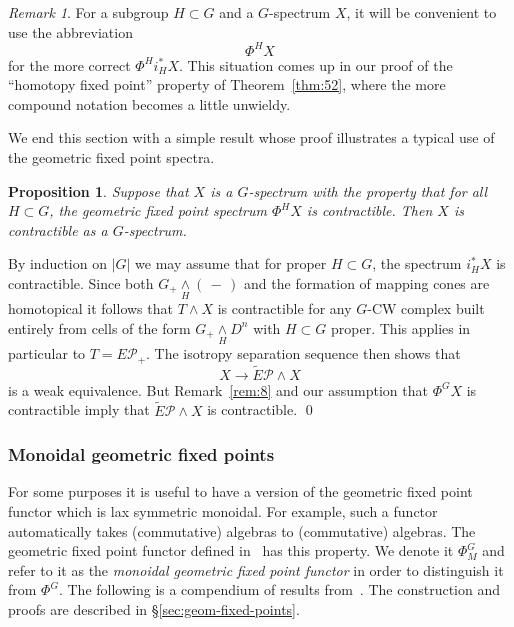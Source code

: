 \documentclass{amsart}
\newtheorem{prop}[equation]{Proposition}
\newtheorem{rem}[equation]{Remark}
\theoremstyle{definition}
\theoremstyle{remark}
\newtheorem{rem}[equation]{Remark}
\newenvironment{pf}{\bigskip{\em Proof:\/}}{\qed\medskip}
\newcommand{\slot}{\,-\,}
\newcommand{\smashove}[1]{\underset{#1}{\wedge}}
\newcommand{\gfp}[1]{\Phi^{#1}}
\newcommand{\gfpm}[1]{\Phi_{M}^{#1}}
\newcommand{\phig}{\gfp{G}}
\newcommand{\phigm}{\gfpm{G}}
\newcommand{\phih}{\gfp{H}}
\newcommand{\epfam}{E\pfamily_{+}}
\newcommand{\tepfam}{\tilde E\pfamily}
\newcommand{\pfamily}{\mathcal P}
\begin{document}
\begin{rem}
\label{rem:6} 
For a subgroup $H\subset G$ and a $G$-spectrum $X$, it
will be convenient to use the abbreviation
\[
\Phi^{H}X
\]
for the more correct $\Phi^{H}i_{H}^{\ast}X$.  This situation comes up
in our proof of the ``homotopy fixed point'' property of
Theorem~\ref{thm:52}, where the more compound notation becomes a
little unwieldy.
\end{rem}

We end this section with a simple result whose proof illustrates a
typical use of the geometric fixed point spectra.   

\begin{prop}
\label{thm:229}
Suppose that $X$ is a $G$-spectrum with the property that for all
$H\subset G$, the geometric fixed point spectrum $\phih X$ is
contractible.   Then $X$ is contractible as a $G$-spectrum.
\end{prop}

\begin{pf}
By induction on $|G|$ we may assume that for proper $H\subset G$, the
spectrum $i_{H}^{\ast}X$ is contractible.  Since both
$G_{+}\underset{H}{\wedge}(\slot)$ and the formation of mapping cones
are homotopical it follows that $T\wedge X$ is contractible for any
$G$-CW complex built entirely from cells of the form
$G_{+}\smashove{H}D^{n}$ with $H\subset G$ proper.  This applies in
particular to $T=\epfam$.  The isotropy separation sequence then shows
that
\[
X\to \tepfam\wedge X
\]
is a weak equivalence.  But Remark~\ref{rem:8} and our assumption that
$\phig X$ is contractible imply that $\tepfam\wedge X$ is contractible.
\end{pf}

\subsubsection{Monoidal geometric fixed points}
\label{sec:mono-geom-fixed} 

For some purposes it is useful to have a version of the geometric
fixed point functor which is lax symmetric monoidal.  For example,
such a functor automatically takes (commutative) algebras to
(commutative) algebras.  The geometric fixed point functor defined
in~\cite[\S{V.4}]{MR1922205} has this property.  We denote it $\phigm$
and refer to it as the {\em monoidal geometric fixed point functor} in
order to distinguish it from $\phig$.  The following is a compendium
of results from~\cite[\S{V.4}]{MR1922205}.  The construction and
proofs are described in \S\ref{sec:geom-fixed-points}.
\end{document}
